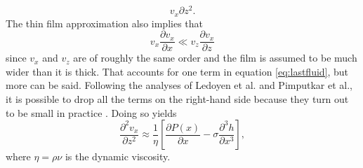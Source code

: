 \documentclass[twocolumn,showpacs,preprintnumbers,amsmath,amssymb]{revtex4}
\begin{document}
\begin{equation}
{                                                                                                                                                                                                                                                                                                                                                                                                                                                                                                                                                                                                                                                                                                                                                                                                                                                                                                                                                                                                                                                                v_x}{\partial z^2} \mathrm{.} \label{eq:lastfluid}
\end{equation}
The thin film approximation also implies that
\begin{equation}
v_x\frac{\partial v_x}{\partial x} \ll v_z\frac{\partial v_x}{\partial z}
\end{equation}
since $v_x$ and $v_z$ are of roughly the same order and the film is assumed to be much
wider than it is thick. That accounts for one term in equation \ref{eq:lastfluid}, but
more can be said. Following the analyses of Ledoyen et al. and Pimputkar et al., it is
possible to drop all the terms on the right-hand side because they turn out to be small
in practice \cite{ledoyen, pimputkar, barrett}. Doing so yields
\begin{equation}
\frac{\partial^2 v_x}{\partial z^2} \approx \frac{1}{\eta}\left[\frac{\partial
P(x)}{\partial x}-\sigma\frac{\partial^3 h}{\partial x^3}\right] \mathrm{,}
\label{eq:start}
\end{equation}
where $\eta= \rho\nu$ is the dynamic viscosity.
\end{document}
